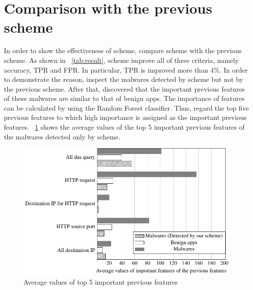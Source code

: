 \section{Comparison with the previous scheme} 
In order to show the effectiveness of \our scheme, \we compare \our scheme with the previous scheme.
As shown in \tablename~\ref{tab:result}, \our scheme improve all of three criteria, namely accuracy, TPR and FPR.
In particular, TPR is improved more than 4\%.
In order to demonstrate the reason, \we inspect the malwares detected by \our scheme but not by the previous scheme.
After that, \we discovered that the important previous features of these malwares are similar to that of benign apps.
The importance of features can be calculated by using the Random Forest classifier. 
Thus, \we regard the top five previous features to which high importance is assigned as the important previous features.
\figurename~\ref{fig:important_prev_feature} shows the average values of the top 5 important previous features of the malwares detected only by \our scheme.
\begin{figure}[p]
	\includegraphics[scale=1.0, bb=10 10 250 250]{./figures/important_prev_f_tikz.pdf}
  \caption{Average values of top 5 important previous features} 
  \label{fig:important_prev_feature}
\end{figure}

